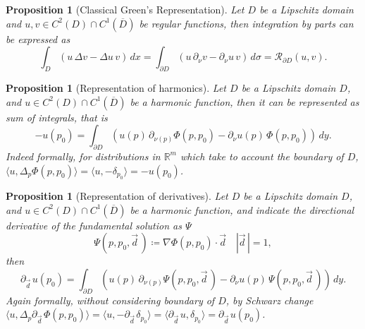 \documentclass[10pt, a4paper, twoside, openright]{book}
\theoremstyle{definition}
\theoremstyle{plain}
\theoremstyle{plain}
\theoremstyle{plain}
\newtheorem{proposition}[subsection]{Proposition}
\theoremstyle{plain}
\theoremstyle{plain}
\theoremstyle{plain}
\theoremstyle{plain}
\theoremstyle{plain}
\begin{document}
\begin{proposition}[Classical Green's Representation]
 Let $D$ be a Lipschitz domain and $u,v \in C^2(D)\cap C^1(\overline{D})$ be regular functions, then integration by parts can be expressed as
  \begin{equation}
  \int_D (u \, \Delta v - \Delta u \, v)\, dx = \int_{\partial D}(u \, \partial_\nu v - \partial_\nu u \, v)\,d\sigma = \mathcal{R}_{\partial D}(u,v).
  \end{equation}
\end{proposition}
\begin{proposition}[Representation of harmonics]
 Let $D$ be a Lipschitz domain $D$, and $u \in C^2(D)\cap C^1(\overline{D})$ be a harmonic function, then it can be represented as sum of integrals, that is
  \begin{equation}
  - u(p_0) = \int_{\partial D}(u(p) \, \partial_{\nu(p)} \Phi(p,p_0) - \partial_\nu u(p) \, \Phi(p,p_0))\,dy.
  \end{equation}
 Indeed formally, for distributions in $\mathbb{R}^m$ which take to account the boundary of $D$, $\langle u,\Delta_p\Phi(p,p_0)\rangle = \langle u,-\delta_{p_0}\rangle = - u(p_0)$.
\end{proposition}
\begin{proposition}[Representation of derivatives]
 \label{prop:repr-deriv}
 Let $D$ be a Lipschitz domain $D$, and $u \in C^2(D)\cap C^1(\overline{D})$ be a harmonic function, and indicate the directional derivative of the fundamental solution as $\Psi$
  \begin{equation}
   \Psi(p,p_0,\vec{d}\,) \coloneqq\nabla\Phi(p,p_0)\cdot\vec{d} \quad |\vec{d}\,|=1,
  \end{equation}
 then
  \begin{equation}
  \partial_{\vec{d}\,}u(p_0) = \int_{\partial D}(u(p) \, \partial_{\nu(p)} \Psi(p,p_0,\vec{d}\,) - \partial_\nu u(p) \, \Psi(p,p_0,\vec{d}\,))\,dy.
  \end{equation}
 Again formally, without considering boundary of $D$, by Schwarz change $\langle u,\Delta_p\partial_{\vec{d}\,}\Phi(p,p_0)\rangle = \langle u,-\partial_{\vec{d}\,}\delta_{p_0}\rangle = \langle \partial_{\vec{d}\,}u,\delta_{p_0}\rangle = \partial_{\vec{d}\,}u(p_0)$.
\end{proposition}
\end{document}
